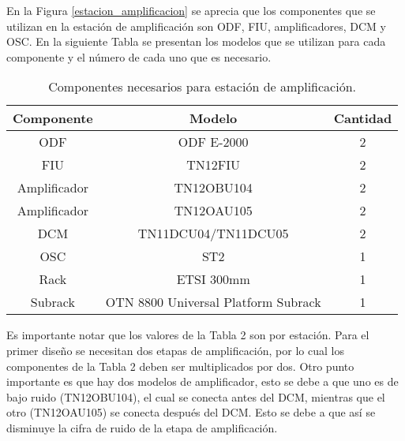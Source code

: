 \documentclass[letterpaper,11pt]{article} %
\begin{document}

\newp
En la Figura \ref{estacion_amplificacion} se aprecia que los componentes que se utilizan en la estación de amplificación son ODF, FIU, amplificadores, DCM y OSC. En la siguiente Tabla se presentan los modelos que se utilizan para cada componente y el número de cada uno que es necesario.



\begin{table}[H]
\begin{tabular}{|c|c|c|}
\hline
\textbf{Componente} & \textbf{Modelo}     & \textbf{Cantidad} \\ \hline
ODF                 & ODF E-2000          & 2                 \\ \hline
FIU                 & TN12FIU             & 2                 \\ \hline
Amplificador        & TN12OBU104          & 2                 \\ \hline
Amplificador        & TN12OAU105          & 2                 \\ \hline
DCM                 & TN11DCU04/TN11DCU05 & 2                 \\ \hline
OSC                 & ST2                 & 1                 \\ \hline
Rack                & ETSI 300mm          & 1                 \\ \hline
Subrack             & OTN 8800 Universal Platform Subrack & 1 \\ \hline
\end{tabular}
\caption{Componentes necesarios para estación de amplificación.}
\end{table}

\newp
Es importante notar que los valores de la Tabla 2 son por estación. Para el primer diseño se necesitan dos etapas de amplificación, por lo cual los componentes de la Tabla 2 deben ser multiplicados por dos. Otro punto importante es que hay dos modelos de amplificador, esto se debe a que uno es de bajo ruido (TN12OBU104), el cual se conecta antes del DCM, mientras que el otro (TN12OAU105) se conecta después del DCM. Esto se debe a que así se disminuye la cifra de ruido de la etapa de amplificación.
\end{document}
